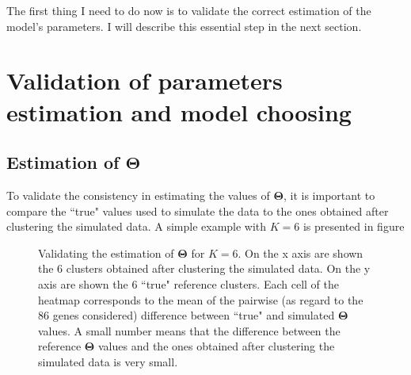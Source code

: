 The first thing I need to do now is to validate the correct estimation of the model's parameters. I will describe this essential step in the next section.


\section{Validation of parameters estimation and model choosing}
	\subsection{Estimation of $\boldsymbol{\Theta}$}
	To validate the consistency in estimating the values of $\boldsymbol{\Theta}$, it is important to compare the ``true" values used to simulate the data to the ones obtained after clustering the simulated data.
	A simple example with $K=6$ is presented in figure 
	
\begin{figure}[bth]
        \myfloatalign
         \quad
        \caption{Validating the estimation of $\boldsymbol{\Theta}$ for $K=6$. On the x axis are shown the 6 clusters obtained after clustering the simulated data. On the y axis are shown the 6 ``true" reference clusters. Each cell of the heatmap corresponds to the mean of the pairwise (as regard to the 86 genes considered) difference between ``true" and simulated $\boldsymbol{\Theta}$ values. A small number means that the difference between the reference $\boldsymbol{\Theta}$ values and the ones obtained after clustering the simulated data is very small.}\label{fig:theta_valid}
\end{figure}
	
